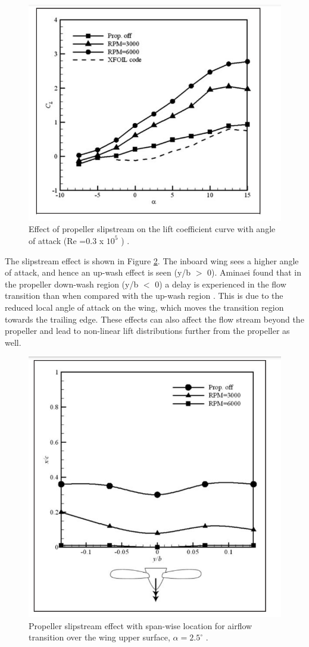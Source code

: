 \begin{figure}[H]
  \centering
  \includegraphics[width=0.7\linewidth]{03_LiteratureReview/Figs/Cl.png}
  \caption{ Effect of propeller slipstream on the lift coefficient
curve with angle of attack (Re =0.3 x $10^5$
) \cite{Aminaei2019}.}
  \label{fig:propanswer}
\end{figure}


The slipstream effect is shown in Figure \ref{fig:peoptoyou}. The inboard wing sees a higher angle of attack, and hence an up-wash effect is seen (y/b $>$ 0). Aminaei found that in the propeller down-wash region (y/b $<$ 0) a delay is experienced in the flow transition than when compared with the up-wash region \cite{Aminaei2019}. This is due to the reduced local angle of attack on the wing, which moves the transition region towards the trailing edge. These effects can also affect the flow stream beyond the propeller and lead to non-linear lift distributions further from the propeller as well. 
 
\begin{figure}[H]
  \centering
  \includegraphics[width=0.8\linewidth]{03_LiteratureReview/Figs/propeller effects.png}
  \caption{Propeller slipstream effect with span-wise location for airflow transition over the wing upper surface, $\alpha = 2.5 ^\circ$ \cite{Aminaei2019}.}
  \label{fig:peoptoyou}
\end{figure}

